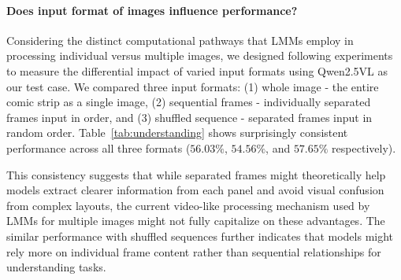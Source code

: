 \paragraph{Does input format of images influence performance?}


Considering the distinct computational pathways that LMMs employ in processing individual versus multiple images, we designed following experiments to measure the differential impact of varied input formats using Qwen2.5VL as our test case. We compared three input formats: (1) whole image - the entire comic strip as a single image, (2) sequential frames - individually separated frames input in order, and (3) shuffled sequence - separated frames input in random order. Table~\ref{tab:understanding} shows surprisingly consistent performance across all three formats ($56.03\%$, $54.56\%$, and $57.65\%$ respectively).

This consistency suggests that while separated frames might theoretically help models extract clearer information from each panel and avoid visual confusion from complex layouts, the current video-like processing mechanism used by LMMs for multiple images might not fully capitalize on these advantages. The similar performance with shuffled sequences further indicates that models might rely more on individual frame content rather than sequential relationships for understanding tasks.


